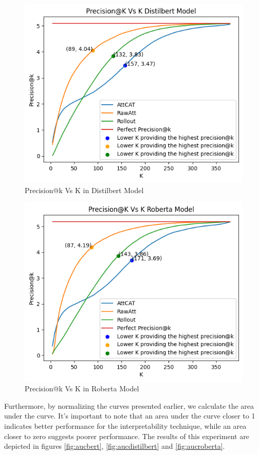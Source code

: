
\begin{figure}[H]
    \centering%
    \includegraphics[width=0.75\linewidth]{Figures/Experimental Setup/Codo_Distilbert_VMRC.png}
    \caption{Precision@k Vs K in Distilbert Model}
    \label{fig:PKdistilbert}
\end{figure}



\begin{figure}[H]
    \centering%
    \includegraphics[width=0.75\linewidth]{Figures/Experimental Setup/Codo_Roberta_VMRC.png}
    \caption{Precision@k Vs K in Roberta Model}
    \label{fig:PKroberta}
\end{figure}


Furthermore, by normalizing the curves presented earlier, we calculate the area under the curve. It's important to note that an area under the curve closer to 1 indicates better performance for the interpretability technique, while an area closer to zero suggests poorer performance. The results of this experiment are depicted in figures \ref{fig:aucbert}, \ref{fig:aucdistilbert} and \ref{fig:aucroberta}.

